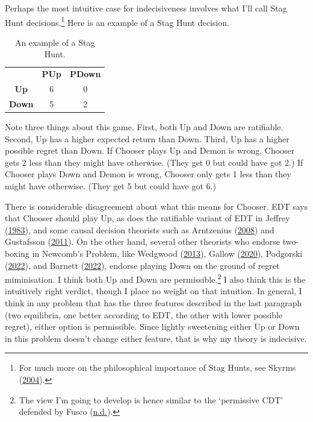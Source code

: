 \documentclass[
  12pt,
  letterpaper,
  DIV=11,
  numbers=noendperiod]{scrreprt}
\begin{document}
Perhaps the most intuitive case for indecisiveness involves what I'll
call Stag Hunt decisions.\footnote{For much more on the philosophical
  importance of Stag Hunts, see Skyrms
  (\protect\hyperlink{ref-Skyrms2004}{2004}).} Here is an example of a
Stag Hunt decision.

\hypertarget{tbl-stag-hunt}{}
\begin{longtable}[]{@{}ccc@{}}
\caption{\label{tbl-stag-hunt}An example of a Stag Hunt.}\tabularnewline
\toprule\noalign{}
\endfirsthead
\endhead
\bottomrule\noalign{}
\endlastfoot
& \textbf{PUp} & \textbf{PDown} \\
\textbf{Up} & 6 & 0 \\
\textbf{Down} & 5 & 2 \\
\end{longtable}

Note three things about this game. First, both Up and Down are
ratifiable. Second, Up has a higher expected return than Down. Third, Up
has a higher possible regret than Down. If Chooser plays Up and Demon is
wrong, Chooser gets 2 less than they might have otherwise. (They get 0
but could have got 2.) If Chooser plays Down and Demon is wrong, Chooser
only gets 1 less than they might have otherwise. (They get 5 but could
have got 6.)

There is considerable disagreement about what this means for Chooser.
EDT says that Chooser should play Up, as does the ratifiable variant of
EDT in Jeffrey (\protect\hyperlink{ref-Jeffrey1983}{1983}), and some
causal decision theorists such as Arntzenius
(\protect\hyperlink{ref-Arntzenius2008}{2008}) and Gustafsson
(\protect\hyperlink{ref-Gustafsson2011}{2011}). On the other hand,
several other theorists who endorse two-boxing in Newcomb's Problem,
like Wedgwood (\protect\hyperlink{ref-Wedgwood2013a}{2013}), Gallow
(\protect\hyperlink{ref-Gallow2020}{2020}), Podgorski
(\protect\hyperlink{ref-Podgorski2022}{2022}), and Barnett
(\protect\hyperlink{ref-Barnett2022}{2022}), endorse playing Down on the
ground of regret miminisation. I think both Up and Down are
permissible.\footnote{The view I'm going to develop is hence similar to
  the `permissive CDT' defended by Fusco
  (\protect\hyperlink{ref-Fuscond}{n.d.}).} I also think this is the
intuitively right verdict, though I place no weight on that intuition.
In general, I think in any problem that has the three features described
in the last paragraph (two equilibria, one better according to EDT, the
other with lower possible regret), either option is permissible. Since
lightly sweetening either Up or Down in this problem doesn't change
either feature, that is why my theory is indecisive.
\end{document}
